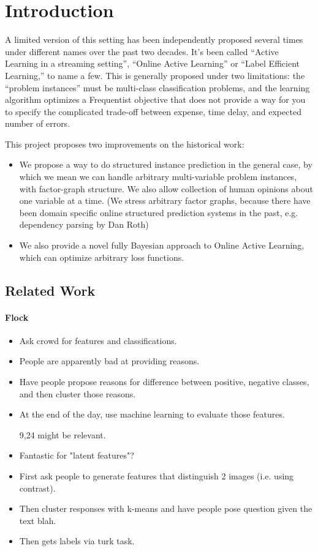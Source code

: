 \section{Introduction}
\label{sec:intro}

A limited version of this setting has been independently proposed
several times under different names over the past two decades. It's been
called ``Active Learning in a streaming setting'', ``Online Active
Learning'' or ``Label Efficient Learning,'' to name a few. This is
generally proposed under two limitations: the ``problem instances'' must
be multi-class classification problems, and the learning algorithm
optimizes a Frequentist objective that does not provide a way for you to
specify the complicated trade-off between expense, time delay, and
expected number of errors.

This project proposes two improvements on the historical work:

\begin{itemize}
  \item We propose a way to do structured instance prediction in the general case, by which we mean we can handle arbitrary multi-variable problem instances, with factor-graph structure. We also allow collection of human opinions about one variable at a time. (We stress arbitrary factor graphs, because there have been domain specific online structured prediction systems in the past, e.g. dependency parsing by Dan Roth)
  \item We also provide a novel fully Bayesian approach to Online Active Learning, which can optimize arbitrary loss functions.

\end{itemize}

\subsection{Related Work}

\paragraph{Flock} \cite{cheng2015flock}
\begin{itemize}
  \item Ask crowd for features and classifications.
  \item People are apparently bad at providing reasons.
  \item Have people propose reasons for difference between positive, negative classes, and then cluster those reasons.
  \item At the end of the day, use machine learning to evaluate those features.
  \item [9,24] might be relevant.
  \item Fantastic for "latent features"?
  \item First ask people to generate features that distinguish 2 images (i.e. using contrast). 
  \item Then cluster responses with k-means and have people pose question given the text blah.
  \item Then gets labels via turk task.
\end{itemize}

